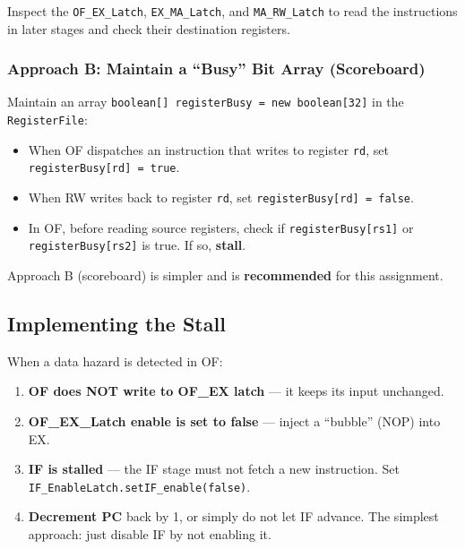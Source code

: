 \documentclass[12pt,a4paper]{article}
\begin{document}
Inspect the \texttt{OF\_EX\_Latch}, \texttt{EX\_MA\_Latch}, and \texttt{MA\_RW\_Latch} to read the instructions in later stages and check their destination registers.

\subsubsection{Approach B: Maintain a ``Busy'' Bit Array (Scoreboard)}

Maintain an array \texttt{boolean[] registerBusy = new boolean[32]} in the \texttt{RegisterFile}:
\begin{itemize}
    \item When OF dispatches an instruction that writes to register \texttt{rd}, set \texttt{registerBusy[rd] = true}.
    \item When RW writes back to register \texttt{rd}, set \texttt{registerBusy[rd] = false}.
    \item In OF, before reading source registers, check if \texttt{registerBusy[rs1]} or \texttt{registerBusy[rs2]} is true. If so, \textbf{stall}.
\end{itemize}

\begin{keypoint}
Approach B (scoreboard) is simpler and is \textbf{recommended} for this assignment.
\end{keypoint}

\subsection{Implementing the Stall}

When a data hazard is detected in OF:

\begin{enumerate}
    \item \textbf{OF does NOT write to OF\_EX latch} --- it keeps its input unchanged.
    \item \textbf{OF\_EX\_Latch enable is set to false} --- inject a ``bubble'' (NOP) into EX.
    \item \textbf{IF is stalled} --- the IF stage must not fetch a new instruction. Set \texttt{IF\_EnableLatch.setIF\_enable(false)}.
    \item \textbf{Decrement PC} back by 1, or simply do not let IF advance. The simplest approach: just disable IF by not enabling it.
\end{enumerate}
\end{document}
